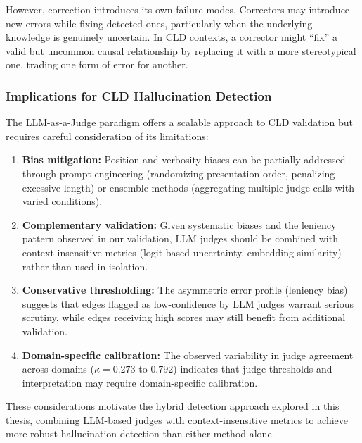 However, correction introduces its own failure modes. Correctors may introduce new errors while fixing detected ones, particularly when the underlying knowledge is genuinely uncertain. In CLD contexts, a corrector might ``fix'' a valid but uncommon causal relationship by replacing it with a more stereotypical one, trading one form of error for another.

\subsubsection{Implications for CLD Hallucination Detection}

The LLM-as-a-Judge paradigm offers a scalable approach to CLD validation but requires careful consideration of its limitations:

\begin{enumerate}
    \item \textbf{Bias mitigation:} Position and verbosity biases can be partially addressed through prompt engineering (randomizing presentation order, penalizing excessive length) or ensemble methods (aggregating multiple judge calls with varied conditions).
    
    \item \textbf{Complementary validation:} Given systematic biases and the leniency pattern observed in our validation, LLM judges should be combined with context-insensitive metrics (logit-based uncertainty, embedding similarity) rather than used in isolation.
    
    \item \textbf{Conservative thresholding:} The asymmetric error profile (leniency bias) suggests that edges flagged as low-confidence by LLM judges warrant serious scrutiny, while edges receiving high scores may still benefit from additional validation.
    
    \item \textbf{Domain-specific calibration:} The observed variability in judge agreement across domains ($\kappa = 0.273$ to $0.792$) indicates that judge thresholds and interpretation may require domain-specific calibration.
\end{enumerate}

These considerations motivate the hybrid detection approach explored in this thesis, combining LLM-based judges with context-insensitive metrics to achieve more robust hallucination detection than either method alone.







